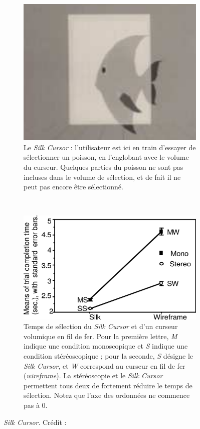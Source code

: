 	\begin{figure}[!htb]
		\begin{subfigure}[t]{0.38\textwidth}
			\centering
			\includegraphics[width=\textwidth]{figures/ch2/silk}
			\caption{Le \emph{Silk Cursor} : l'utilisateur est ici en train d'essayer de sélectionner un poisson, en l'englobant avec le volume du curseur. Quelques parties du poisson ne sont pas incluses dans le volume de sélection, et de fait il ne peut pas encore être sélectionné.}
			\label{fig:silk}
		\end{subfigure}
		~
		\begin{subfigure}[t]{0.60\textwidth}
			\centering
			\includegraphics[width=\textwidth]{figures/ch2/silkPerf}
			\caption{Temps de sélection du \emph{Silk Cursor} et d'un curseur volumique en fil de fer. Pour la première lettre, \emph{M} indique une condition monoscopique et \emph{S} indique une condition stéréoscopique ; pour la seconde, \emph{S} désigne le \emph{Silk Cursor}, et \emph{W} correspond au curseur en fil de fer (\emph{wireframe}). La stéréoscopie et le \emph{Silk Cursor} permettent tous deux de fortement réduire le temps de sélection. Notez que l'axe des ordonnées ne commence pas à 0.}
			\label{fig:silkPerf}
		\end{subfigure}
		\caption[\emph{Silk Cursor}]{\emph{Silk Cursor}. Crédit : \cite{zhai1994silk}}
		\label{fig:silkCursorPerf}
	\end{figure}
	
